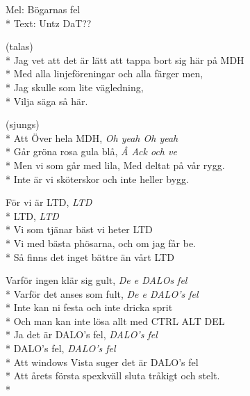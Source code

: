 \begin{SongText}
    \begin{SongInfo}
        Mel: Bögarnas fel\\*%
        Text: Untz DaT?? %
    \end{SongInfo}
    \begin{SongVerse}
        (talas)\\*%
        Jag vet att det är lätt att tappa bort sig här på MDH\\*%
        Med alla linjeföreningar och alla färger men, \\*%
        Jag skulle som lite vägledning, \\*%
        Vilja säga så här.
    \end{SongVerse}
    \begin{SongVerse}
        (sjungs)\\*%
        Att Över hela MDH, \textit{Oh yeah Oh yeah}\\*%
        Går gröna rosa gula blå, \textit{Å Ack och ve}\\*%
        Men vi som går med lila, Med deltat på vår rygg.\\*%
        Inte är vi sköterskor och inte heller bygg.
    \end{SongVerse}
    \begin{SongVerse}
        För vi är LTD, \textit{LTD}\\*%
        LTD, \textit{LTD}\\*%
        Vi som tjänar bäst vi heter LTD\\*%
        Vi med bästa phösarna, och om jag får be.\\*%
        Så finns det inget bättre än vårt LTD
    \end{SongVerse}
    \begin{SongVerse}
        Varför ingen klär sig gult, \textit{De e DALOs fel}\\*%
        Varför det anses som fult, \textit{De e DALO's fel}\\*%
        Inte kan ni festa och inte dricka sprit\\*%
        Och man kan inte lösa allt med CTRL ALT DEL\\*%
        Ja det är DALO's fel, \textit{DALO's fel} \\*%
        DALO's fel, \textit{DALO's fel}\\*%
        Att windows Vista suger det är DALO's fel\\*%
        Att årets första spexkväll sluta tråkigt och stelt.\\*%

\end{SongVerse}
\end{SongText}
